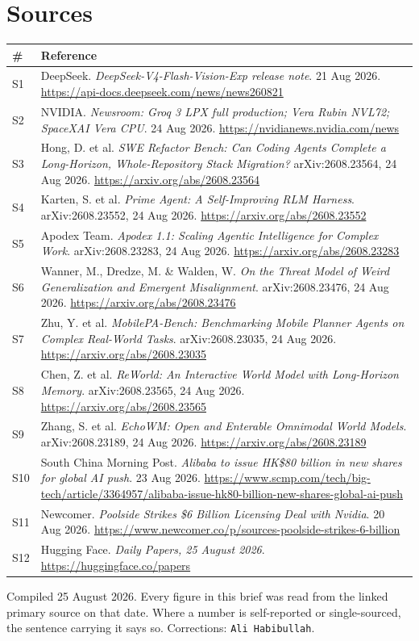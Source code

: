 \documentclass[11pt,a4paper]{article}
\newcommand{\briefdate}{25 August 2026}
\newcommand{\briefauthor}{Ali Habibullah}
\begin{document}
\section{Sources}
{\footnotesize
\begin{tabularx}{\textwidth}{@{}l X@{}}
\toprule
\textbf{\#} & \textbf{Reference} \\
\midrule
S1 & DeepSeek. \emph{DeepSeek-V4-Flash-Vision-Exp release note}. 21 Aug 2026. \url{https://api-docs.deepseek.com/news/news260821} \\
S2 & NVIDIA. \emph{Newsroom: Groq 3 LPX full production; Vera Rubin NVL72; SpaceXAI Vera CPU}. 24 Aug 2026. \url{https://nvidianews.nvidia.com/news} \\
S3 & Hong, D. et al. \emph{SWE Refactor Bench: Can Coding Agents Complete a Long-Horizon, Whole-Repository Stack Migration?} arXiv:2608.23564, 24 Aug 2026. \url{https://arxiv.org/abs/2608.23564} \\
S4 & Karten, S. et al. \emph{Prime Agent: A Self-Improving RLM Harness}. arXiv:2608.23552, 24 Aug 2026. \url{https://arxiv.org/abs/2608.23552} \\
S5 & Apodex Team. \emph{Apodex 1.1: Scaling Agentic Intelligence for Complex Work}. arXiv:2608.23283, 24 Aug 2026. \url{https://arxiv.org/abs/2608.23283} \\
S6 & Wanner, M., Dredze, M. \& Walden, W. \emph{On the Threat Model of Weird Generalization and Emergent Misalignment}. arXiv:2608.23476, 24 Aug 2026. \url{https://arxiv.org/abs/2608.23476} \\
S7 & Zhu, Y. et al. \emph{MobilePA-Bench: Benchmarking Mobile Planner Agents on Complex Real-World Tasks}. arXiv:2608.23035, 24 Aug 2026. \url{https://arxiv.org/abs/2608.23035} \\
S8 & Chen, Z. et al. \emph{ReWorld: An Interactive World Model with Long-Horizon Memory}. arXiv:2608.23565, 24 Aug 2026. \url{https://arxiv.org/abs/2608.23565} \\
S9 & Zhang, S. et al. \emph{EchoWM: Open and Enterable Omnimodal World Models}. arXiv:2608.23189, 24 Aug 2026. \url{https://arxiv.org/abs/2608.23189} \\
S10 & South China Morning Post. \emph{Alibaba to issue HK\$80 billion in new shares for global AI push}. 23 Aug 2026. \url{https://www.scmp.com/tech/big-tech/article/3364957/alibaba-issue-hk80-billion-new-shares-global-ai-push} \\
S11 & Newcomer. \emph{Poolside Strikes \$6 Billion Licensing Deal with Nvidia}. 20 Aug 2026. \url{https://www.newcomer.co/p/sources-poolside-strikes-6-billion} \\
S12 & Hugging Face. \emph{Daily Papers, 25 August 2026}. \url{https://huggingface.co/papers} \\
\bottomrule
\end{tabularx}}

\vspace{0.8em}
{\footnotesize\color{brandgrey}
Compiled \briefdate. Every figure in this brief was read from the linked primary
source on that date. Where a number is self-reported or single-sourced, the
sentence carrying it says so. Corrections: \texttt{\briefauthor}.}
\end{document}
